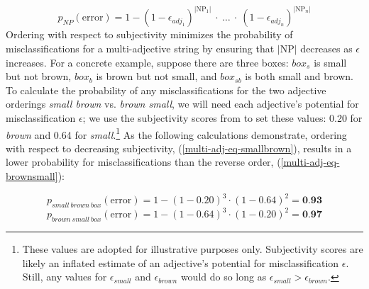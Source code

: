 \documentclass{sp}
\newcommand{\gcs}[1]{\textcolor{blue}{[gcs: #1]}}
\begin{document}
\begin{equation} \label{multi-adj-eq}
p_{N\!P}(\textrm{error}) = 1 - (1-\epsilon_{adj_1})^{|\textrm{NP}_1|}\ \cdot\ \ldots\ \cdot\ (1-\epsilon_{adj_n})^{|\textrm{NP}_n|}
\end{equation}
Ordering with respect to subjectivity minimizes the probability of misclassifications for a multi-adjective string by ensuring that $|\textrm{NP}|$ decreases as $\epsilon$ increases. For a concrete example, suppose there are three boxes: $box_{s}$ is small but not brown, $box_{b}$ is brown but not small, and $box_{sb}$ is both small and brown. To calculate the probability of any misclassifications for the two adjective orderings \emph{small brown} vs. \emph{brown small}, we will need each adjective's potential for misclassification $\epsilon$; we use the subjectivity scores from \cite{scontrasetal2017adjectives} to set these values: 0.20 for \emph{brown} and 0.64 for \emph{small}.\footnote{These values are adopted for illustrative purposes only. Subjectivity scores are likely an inflated estimate of an adjective's potential for misclassification $\epsilon$. Still, any values for $\epsilon_{small}$ and $\epsilon_{brown}$ would do so long as $\epsilon_{small} > \epsilon_{brown}$.} As the following calculations demonstrate, ordering with respect to decreasing subjectivity, (\ref{multi-adj-eq-smallbrown}), results in a lower probability for misclassifications than the reverse order, (\ref{multi-adj-eq-brownsmall}):

\begin{equation} \label{multi-adj-eq-smallbrown}
p_{small\ brown\ box}(\textrm{error}) = 1 - (1-0.20)^{3} \cdot (1-0.64)^{2} = \textbf{0.93}
\end{equation}
\begin{equation} \label{multi-adj-eq-brownsmall}
p_{brown\ small\ box}(\textrm{error}) = 1 - (1-0.64)^{3} \cdot (1-0.20)^{2} = \textbf{0.97}
\end{equation}
\end{document}
